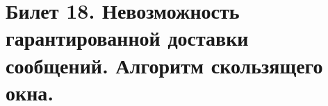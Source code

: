 \newpage
\section {Билет 18. Невозможность гарантированной доставки сообщений. Алгоритм скользящего окна.}